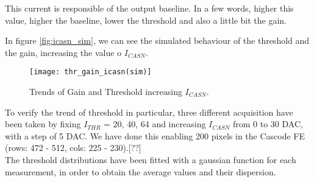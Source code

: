 This current is responsible of the output baseline. In a few words, higher this value, higher the baseline, lower the threshold and also a little bit the gain.

In figure \vref{fig:icasn_sim}, we can see the simulated behaviour of the threshold and the gain, increasing the value o $I_{CASN}$.

\begin{figure}[h!]
\centering
\texttt{[image: thr\_gain\_icasn(sim)]}
\caption{Trends of Gain and Threshold increasing $I_{CASN}$.}
\label{fig:icasn_sim}
\end{figure}

To verify the trend of threshold in particular, three different acquisition have been taken by fixing $I_{THR}$ = 20, 40, 64 and increasing $I_{CASN}$ from 0  to 30 DAC, with a step of 5 DAC. We have done this enabling 200 pixels in the Cascode FE (rows: 472 - 512, cols: 225 - 230).[??]\\

The threshold distributions have been fitted with a gaussian function for each measurement,  in order to obtain the average values and their dispersion.

